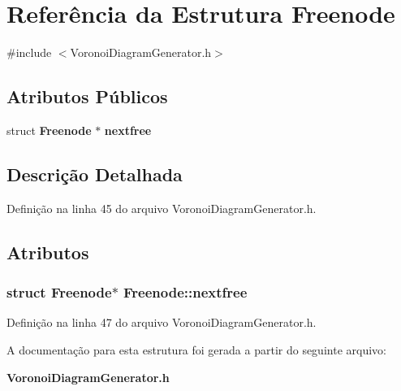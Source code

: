 \section{Referência da Estrutura Freenode}
\label{struct_freenode}


{\ttfamily \#include $<$Voronoi\+Diagram\+Generator.\+h$>$}

\subsection*{Atributos Públicos}
\begin{DoxyCompactItemize}
\item 
struct {\bf Freenode} $\ast$ {\bf nextfree}
\end{DoxyCompactItemize}


\subsection{Descrição Detalhada}


Definição na linha 45 do arquivo Voronoi\+Diagram\+Generator.\+h.



\subsection{Atributos}
\subsubsection[{nextfree}]{\setlength{\rightskip}{0pt plus 5cm}struct {\bf Freenode}$\ast$ Freenode\+::nextfree}\label{struct_freenode_ab61a382af68dc15e3e9576902ab4e906}


Definição na linha 47 do arquivo Voronoi\+Diagram\+Generator.\+h.



A documentação para esta estrutura foi gerada a partir do seguinte arquivo\+:\begin{DoxyCompactItemize}
\item 
{\bf Voronoi\+Diagram\+Generator.\+h}\end{DoxyCompactItemize}
